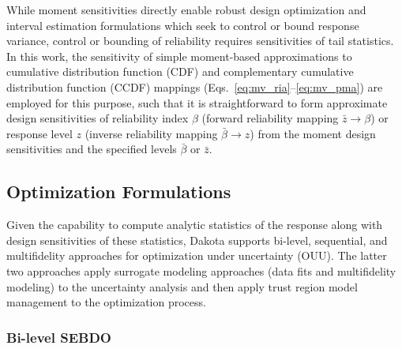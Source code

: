 While moment sensitivities directly enable robust design optimization
and interval estimation formulations which seek to control or bound
response variance, control or bounding of reliability requires
sensitivities of tail statistics.  In this work, the sensitivity of
simple moment-based approximations to cumulative distribution function
(CDF) and complementary cumulative distribution function (CCDF)
mappings (Eqs.~\ref{eq:mv_ria}--\ref{eq:mv_pma}) are employed for this
purpose, such that it is straightforward to form approximate design
sensitivities of reliability index $\beta$ (forward reliability
mapping $\bar{z} \rightarrow \beta$) or response level $z$ (inverse
reliability mapping $\bar{\beta} \rightarrow z$) from the moment
design sensitivities and the specified levels $\bar{\beta}$ or
$\bar{z}$.
%


\subsection{Optimization Formulations} \label{ouu:sebdo:form}

Given the capability to compute analytic statistics of the response
along with design sensitivities of these statistics, Dakota supports
bi-level, sequential, and multifidelity approaches for optimization
under uncertainty (OUU). %
The latter two approaches apply surrogate modeling approaches (data 
fits and multifidelity modeling) to the uncertainty analysis and then 
apply trust region model management to the optimization process.

\subsubsection{Bi-level SEBDO} \label{ouu:sebdo:form:bilev}

